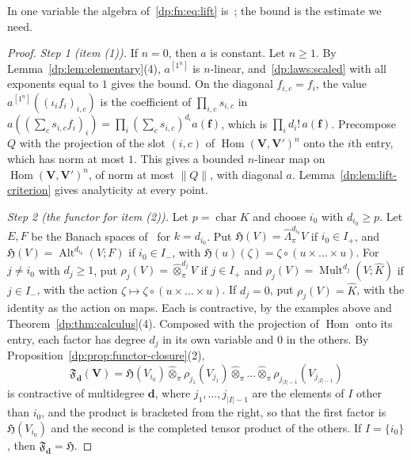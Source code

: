 \documentclass[11pt]{amsart}
\theoremstyle{definition}
\theoremstyle{remark}
\numberwithin{equation}{section}
\newcommand{\Alt}{\operatorname{Alt}}
\newcommand{\Mult}{\operatorname{Mult}}
\newcommand{\abs}[1]{\lvert #1\rvert}
\newcommand{\norm}[1]{\lVert #1\rVert}
\newcommand{\Kh}{\widehat K}
\theoremstyle{plain}
\theoremstyle{definition}
\theoremstyle{plain}
\newcommand{\hot}{\mathbin{\widehat\otimes}}
\newcommand{\hLambda}{\widehat\Lambda}
\begin{document}
In one variable the algebra of~\eqref{dp:fn:eq:lift} is~\cite[Th.~II.1]{Ro}; the bound is the estimate we need.

\begin{proof}
\emph{Step 1 (item (1)).} If $n=0$, then $a$ is constant. Let $n\ge1$. By Lemma~\ref{dp:lem:elementary}(4), $a^{[1^n]}$ is $n$\nobreakdash-linear, and~\eqref{dp:laws:scaled} with all exponents equal to $1$ gives the bound. On the diagonal $f_{i,c}=f_i$, the value $a^{[1^n]}((\iota_if_i)_{i,c})$ is the coefficient of $\prod_{i,c}s_{i,c}$ in $a((\sum_cs_{i,c}f_i)_i)=\prod_i(\sum_cs_{i,c})^{d_i}a(\mathbf f)$, which is $\prod_id_i!\,a(\mathbf f)$. Precompose $Q$ with the projection of the slot $(i,c)$ of $\operatorname{Hom}(\mathbf V,\mathbf V')^n$ onto the $i$th entry, which has norm at most $1$. This gives a bounded $n$\nobreakdash-linear map on $\operatorname{Hom}(\mathbf V,\mathbf V')^n$, of norm at most $\norm Q$, with diagonal $a$. Lemma~\ref{dp:lem:lift-criterion} gives analyticity at every point.

\emph{Step 2 (the functor for item (2)).} Let $p=\operatorname{char}K$ and choose $i_0$ with $d_{i_0}\ge p$. Let $E,F$ be the Banach spaces of~\cite[Theorem~7.2(1)]{I} for $k=d_{i_0}$. Put $\mathfrak H(V)=\hLambda^{d_{i_0}}_\pi V$ if $i_0\in I_+$, and $\mathfrak H(V)=\Alt^{d_{i_0}}(V;F)$ if $i_0\in I_-$, with $\mathfrak H(u)(\zeta)=\zeta\circ(u\times\dots\times u)$. For $j\ne i_0$ with $d_j\ge1$, put $\rho_j(V)=\hot^{d_j}_\pi V$ if $j\in I_+$ and $\rho_j(V)=\Mult^{d_j}(V;\Kh)$ if $j\in I_-$, with the action $\zeta\mapsto\zeta\circ(u\times\dots\times u)$. If $d_j=0$, put $\rho_j(V)=\Kh$, with the identity as the action on maps. Each is contractive, by the examples above and Theorem~\ref{dp:thm:calculus}(4). Composed with the projection of $\operatorname{Hom}$ onto its entry, each factor has degree $d_j$ in its own variable and $0$ in the others. By Proposition~\ref{dp:prop:functor-closure}(2),
\[
 \mathfrak F_{\mathbf d}(\mathbf V)=\mathfrak H(V_{i_0})\mathbin{\widehat\otimes_\pi}\rho_{j_1}(V_{j_1})\mathbin{\widehat\otimes_\pi}\dots\mathbin{\widehat\otimes_\pi}\rho_{j_{\abs I-1}}(V_{j_{\abs I-1}})
\]
is contractive of multidegree $\mathbf d$, where $j_1,\dots,j_{\abs I-1}$ are the elements of $I$ other than $i_0$, and the product is bracketed from the right, so that the first factor is $\mathfrak H(V_{i_0})$ and the second is the completed tensor product of the others. If $I=\{i_0\}$, then $\mathfrak F_{\mathbf d}=\mathfrak H$.


\end{proof}
\end{document}
